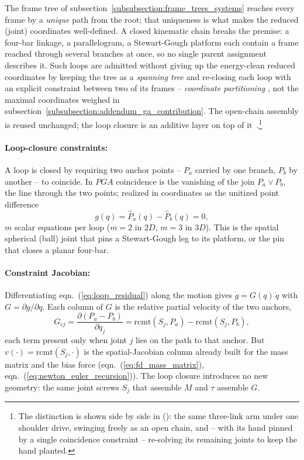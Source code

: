 The frame tree of subsection~\ref{subsubsection:frame_trees_systems} reaches every frame
by a \emph{unique} path from the root; that uniqueness is what makes the reduced (joint)
coordinates well-defined. A closed kinematic chain breaks the premise: a four-bar linkage,
a parallelogram, a Stewart-Gough platform each contain a frame reached through several
branches at once, so no single parent assignment describes it. Such loops are admitted
without giving up the energy-clean reduced coordinates by keeping the tree as a
\emph{spanning tree} and re-closing each loop with an explicit constraint between two of
its frames -- \emph{coordinate partitioning}
\cite{Wehage_Haug_coordinate_partitioning:1982}, not the maximal coordinates weighed in
subsection~\ref{subsubsection:addendum_ga_contribution}. The open-chain assembly is reused
unchanged; the loop closure is an additive layer on top of
it~\cite{Featherstone_rigid_body_dynamics:2008}.\footnote{The distinction is shown side by
side in  (): the same three-link arm
under one shoulder drive, swinging freely as an open chain, and -- with its hand pinned by
a single coincidence constraint -- re-solving its remaining joints to keep the hand
planted.}

\paragraph{Loop-closure constraints:} A loop is closed by requiring two anchor points --
$P_a$ carried by one branch, $P_b$ by another -- to coincide. In $PGA$ coincidence is the
vanishing of the join $P_a \vee P_b$, the line through the two points; realized in
coordinates as the unitized point difference
\begin{equation}
    g(q) = \hat{P}_a(q) - \hat{P}_b(q) = 0,
    \label{eq:loop_residual}
\end{equation}
$m$ scalar equations per loop ($m = 2$ in $2D$, $m = 3$ in $3D$). This is the spatial
spherical (ball) joint that pins a Stewart-Gough leg to its platform, or the pin that
closes a planar four-bar.

\paragraph{Constraint Jacobian:} Differentiating eqn.~(\ref{eq:loop_residual}) along the
motion gives $\dot{g} = G(q)\,\dot{q}$ with $G = \partial g / \partial q$. Each column of
$G$ is the relative partial velocity of the two anchors,
\begin{equation}
    G_{cj} = \frac{\partial (P_a - P_b)}{\partial q_j}
           = \mathrm{rcmt}(S_j, P_a) - \mathrm{rcmt}(S_j, P_b),
    \label{eq:loop_jacobian}
\end{equation}
each term present only when joint $j$ lies on the path to that anchor. But $v(\cdot) =
\mathrm{rcmt}(S_j,\cdot)$ is the spatial-Jacobian column already built for the
mass matrix and the bias force (eqn.~(\ref{eq:fd_mass_matrix}),
eqn.~(\ref{eq:newton_euler_recursion})). The loop closure introduces no new geometry: the
same joint screws $S_j$ that assemble $M$ and $\tau$ assemble $G$.

